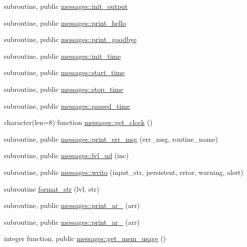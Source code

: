 \begin{DoxyCompactItemize}
\item 
subroutine, public \hyperlink{namespacemessages_aff8b6368cf0f8895b0f6c357df98cc21}{messages\+::init\+\_\+output}
\item 
subroutine, public \hyperlink{namespacemessages_afb11646c8cb3655bdfc2f9c039851c0c}{messages\+::print\+\_\+hello}
\item 
subroutine, public \hyperlink{namespacemessages_a0b3d8398d726bbf90e0c6df9f2df2c88}{messages\+::print\+\_\+goodbye}
\item 
subroutine, public \hyperlink{namespacemessages_a16a1008834c161135f444d8e8e6d78d7}{messages\+::init\+\_\+time}
\item 
subroutine, public \hyperlink{namespacemessages_ad997c3dff64c512e0070ce8816c28e7f}{messages\+::start\+\_\+time}
\item 
subroutine, public \hyperlink{namespacemessages_a2a1154de25763d4894275ff4307b6862}{messages\+::stop\+\_\+time}
\item 
subroutine, public \hyperlink{namespacemessages_aced7e14a8b4fbed8eae60217b71ca546}{messages\+::passed\+\_\+time}
\item 
character(len=8) function \hyperlink{namespacemessages_a61fd0b51b5e37d58fdc993c01792a3fd}{messages\+::get\+\_\+clock} ()
\item 
subroutine, public \hyperlink{namespacemessages_a0da9248828de8b7480b99b47618e8310}{messages\+::print\+\_\+err\+\_\+msg} (err\+\_\+msg, routine\+\_\+name)
\item 
subroutine, public \hyperlink{namespacemessages_a6e6bfb084063e4cc91ee86e542043302}{messages\+::lvl\+\_\+ud} (inc)
\item 
subroutine, public \hyperlink{namespacemessages_aa4a8d01563e92558e8a0875b075ec54c}{messages\+::writo} (input\+\_\+str, persistent, error, warning, alert)
\item 
subroutine \hyperlink{messages_8f90_a6d15f28783f95a7a4b2a44185619792f}{format\+\_\+str} (lvl, str)
\item 
subroutine, public \hyperlink{namespacemessages_a80797cedef6112b8dccaeda431f0c610}{messages\+::print\+\_\+ar\+\_} (arr)
\item 
subroutine, public \hyperlink{namespacemessages_a5686118397930f505259225f3688216b}{messages\+::print\+\_\+ar\+\_} (arr)
\item 
integer function, public \hyperlink{namespacemessages_a82dddaab795b78b3d39e1ff1aab2f665}{messages\+::get\+\_\+mem\+\_\+usage} ()
\end{DoxyCompactItemize}
